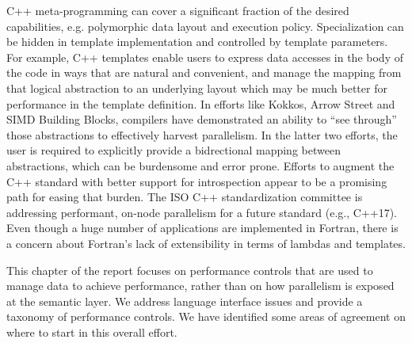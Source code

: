 C++ meta-programming can cover a significant fraction of the desired
capabilities, e.g. polymorphic data layout and execution policy.
Specialization can be hidden in template implementation and controlled
by template parameters.  For example, C++ templates enable users to
express data accesses in the body of the code in ways that are natural
and convenient, and manage the mapping from that logical abstraction
to an underlying layout which may be much better for performance in
the template definition.  In efforts like Kokkos, Arrow Street and
SIMD Building Blocks,  compilers have
demonstrated an ability to ``see through'' those abstractions to
effectively harvest parallelism.  In the latter two efforts, the user
is required to explicitly provide a bidrectional mapping between
abstractions, which can be burdensome and error prone.  Efforts to
augment the C++ standard with better support for introspection appear
to be a promising path for easing that burden.  The ISO C++
standardization committee is addressing performant, on-node
parallelism for a future standard (e.g., C++17).  Even though a huge
number of applications are implemented in Fortran, there is a concern
about Fortran's lack of extensibility in terms of lambdas and
templates.

This chapter of the report focuses on performance controls that are
used to manage data to achieve performance, rather than on how
parallelism is exposed at the semantic layer.  We address language
interface issues and provide a taxonomy of performance controls.
 We have
identified some areas of agreement on where to start in this overall
effort.


